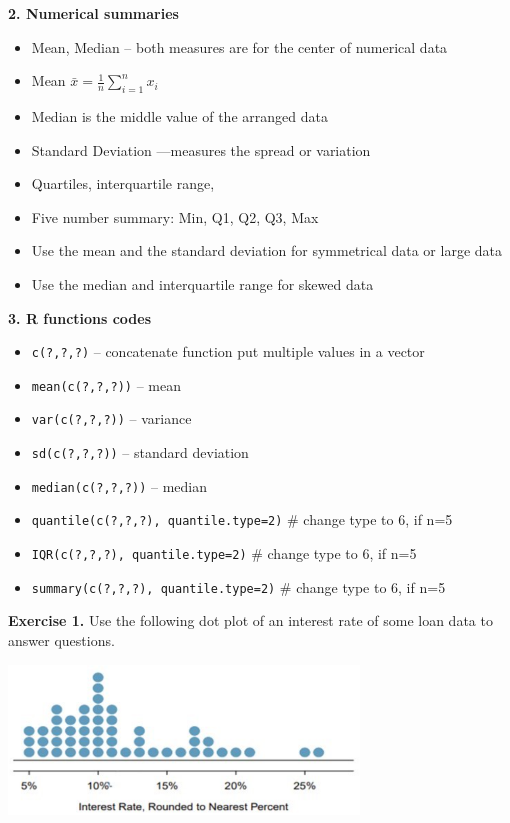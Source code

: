 \documentclass[
]{book}
\providecommand{\tightlist}{%
  \setlength{\itemsep}{0pt}\setlength{\parskip}{0pt}}
\begin{document}
\textbf{2. Numerical summaries}

\begin{itemize}
\tightlist
\item
  Mean, Median -- both measures are for the center of numerical data
\item
  Mean \(\bar{x} = \frac{1}{n} \sum_{i=1}^{n} x_i\)\\
\item
  Median is the middle value of the arranged data
\item
  Standard Deviation ---measures the spread or variation
\item
  Quartiles, interquartile range,
\item
  Five number summary: Min, Q1, Q2, Q3, Max
\item
  Use the mean and the standard deviation for symmetrical data or large data
\item
  Use the median and interquartile range for skewed data
\end{itemize}

\textbf{3. R functions codes}

\begin{itemize}
\tightlist
\item
  \texttt{c(?,?,?)} -- concatenate function put multiple values in a vector
\item
  \texttt{mean(c(?,?,?))} -- mean
\item
  \texttt{var(c(?,?,?))} -- variance
\item
  \texttt{sd(c(?,?,?))} -- standard deviation
\item
  \texttt{median(c(?,?,?))} -- median
\item
  \texttt{quantile(c(?,?,?),\ quantile.type=2)} \# change type to 6, if n=5
\item
  \texttt{IQR(c(?,?,?),\ quantile.type=2)} \# change type to 6, if n=5
\item
  \texttt{summary(c(?,?,?),\ quantile.type=2)} \# change type to 6, if n=5
\end{itemize}

\textbf{Exercise 1.} Use the following dot plot of an interest rate of some loan data to answer questions.

\includegraphics[width=3.66667in,height=\textheight]{images/img23.png}
\end{document}

